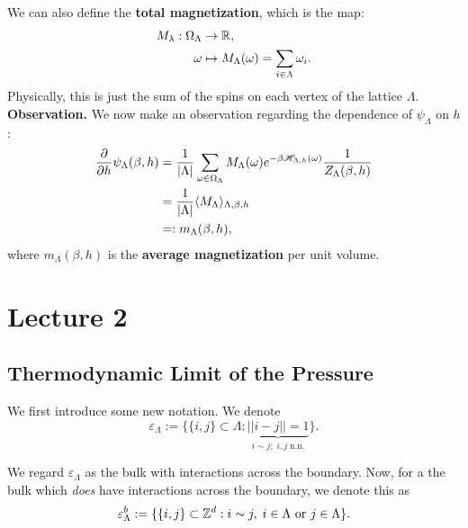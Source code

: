 \documentclass{article}
\begin{document}
We can also define the \textbf{total magnetization}, which is the map:
\begin{align}
  M_{\lambda} : \Omega_{\Lambda} &\to \mathbb{R}, \\
  \omega &\mapsto M_{\Lambda}(\omega) = \sum\limits_{i \in \Lambda} \omega_i.
\end{align}
Physically, this is just the sum of the spins on each vertex of the lattice $\Lambda$.\\

\noindent\textbf{Observation.} We now make an observation regarding the dependence of $\psi_{\Lambda}$ on $h$:
\begin{align}
\label{eq:6}
  \frac{\partial}{\partial h} \psi_{\Lambda}(\beta,h) &= \frac{1}{|\Lambda|}\sum\limits_{\omega\in\Omega_{\Lambda}} M_{\Lambda}(\omega) e^{-\beta\mathscr{H}_{\Lambda,h}(\omega)} \frac{1}{Z_{\Lambda}(\beta,h)} \\
                                                      &= \frac{1}{|\Lambda|} \langle M_{\Lambda} \rangle_{\Lambda, \beta, h} \\
  &=: m_{\Lambda}(\beta, h),
\end{align}
where $m_{\Lambda}(\beta, h)$ is the \textbf{average magnetization} per unit volume.

\section{Lecture 2}

\subsection{Thermodynamic Limit of the Pressure}

We first introduce some new notation. We denote
\begin{equation}
  \varepsilon_{\Lambda} := \{ \{ i, j \} \subset \Lambda : \underbrace{|| i - j || = 1}_{i \sim j ; \; i, j \; \text{n.n.}} \}.
\end{equation}

We regard $\varepsilon_{\Lambda}$ as the bulk with interactions across the boundary. Now, for a the bulk which \textit{does} have interactions across the boundary, we denote this as
\begin{equation}
  \varepsilon_{\Lambda}^{b} := \{ \{ i, j \} \subset \mathbb{Z}^d : i \sim j, \; i \in \Lambda \text{ or } j \in \Lambda \}.
\end{equation}
\end{document}
